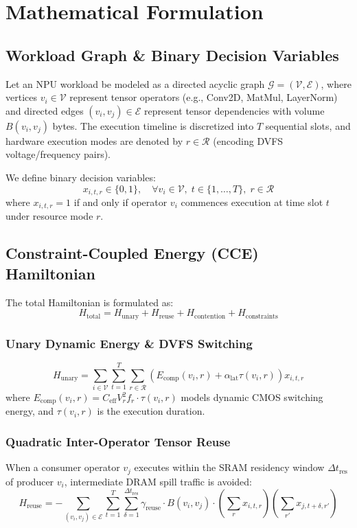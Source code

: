 \documentclass[journal]{IEEEtran}
\theoremstyle{definition}
\begin{document}
\section{Mathematical Formulation}
\subsection{Workload Graph & Binary Decision Variables}
Let an NPU workload be modeled as a directed acyclic graph $\mathcal{G} = (\mathcal{V}, \mathcal{E})$, where vertices $v_i \in \mathcal{V}$ represent tensor operators (e.g., Conv2D, MatMul, LayerNorm) and directed edges $(v_i, v_j) \in \mathcal{E}$ represent tensor dependencies with volume $B(v_i, v_j)$ bytes. The execution timeline is discretized into $T$ sequential slots, and hardware execution modes are denoted by $r \in \mathcal{R}$ (encoding DVFS voltage/frequency pairs).

We define binary decision variables:
\begin{equation}
x_{i,t,r} \in \{0, 1\}, \quad \forall v_i \in \mathcal{V}, \; t \in \{1, \dots, T\}, \; r \in \mathcal{R}
\end{equation}
where $x_{i,t,r} = 1$ if and only if operator $v_i$ commences execution at time slot $t$ under resource mode $r$.

\subsection{Constraint-Coupled Energy (CCE) Hamiltonian}
The total Hamiltonian is formulated as:
\begin{equation}
H_{\text{total}} = H_{\text{unary}} + H_{\text{reuse}} + H_{\text{contention}} + H_{\text{constraints}}
\end{equation}

\subsubsection{Unary Dynamic Energy & DVFS Switching}
\begin{equation}
H_{\text{unary}} = \sum_{i \in \mathcal{V}} \sum_{t=1}^T \sum_{r \in \mathcal{R}} \left( E_{\text{comp}}(v_i, r) + \alpha_{\text{lat}} \tau(v_i, r) \right) x_{i,t,r}
\end{equation}
where $E_{\text{comp}}(v_i, r) = C_{\text{eff}} V_r^2 f_r \cdot \tau(v_i, r)$ models dynamic CMOS switching energy, and $\tau(v_i, r)$ is the execution duration.

\subsubsection{Quadratic Inter-Operator Tensor Reuse}
When a consumer operator $v_j$ executes within the SRAM residency window $\Delta t_{\text{res}}$ of producer $v_i$, intermediate DRAM spill traffic is avoided:
\begin{equation}
H_{\text{reuse}} = -\sum_{(v_i, v_j) \in \mathcal{E}} \sum_{t=1}^T \sum_{\delta=1}^{\Delta t_{\text{res}}} \gamma_{\text{reuse}} \cdot B(v_i, v_j) \cdot \left( \sum_r x_{i,t,r} \right) \left( \sum_{r'} x_{j,t+\delta,r'} \right)
\end{equation}
\end{document}
